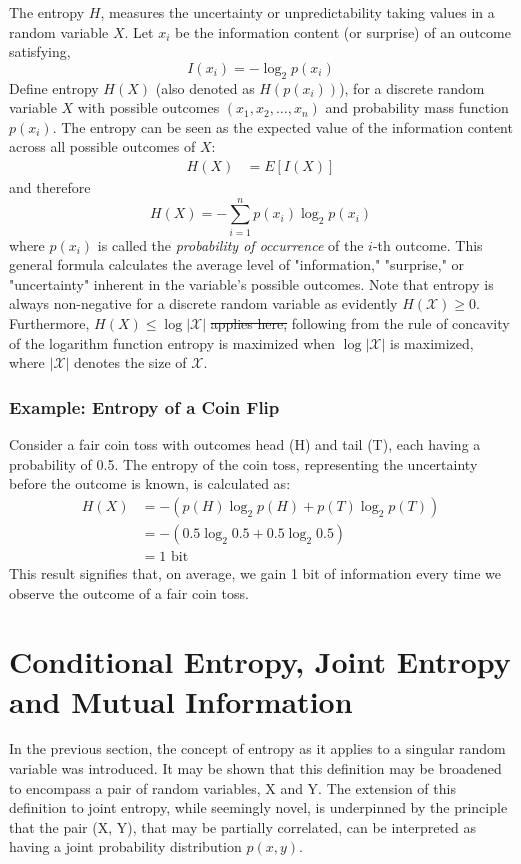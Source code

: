 \documentclass[12pt]{article}
\begin{document}
	The entropy $H$, measures the uncertainty or unpredictability taking values in a random variable $X$. Let $x_i$ be the information content (or surprise) of an outcome satisfying,
	\begin{equation}
		I(x_i) = -\log_2 p(x_i)
	\end{equation}
	Define entropy  $H(X)$ (also denoted as $H(p(x_i))$), for a discrete random variable $X$ with possible outcomes $(x_1, x_2, \ldots, x_n)$ and probability mass function $p(x_i)$. The entropy can be seen as the expected value of the information content across all possible outcomes of $X$:
	\begin{align}
		H(X) &= E[I(X)] 
	\end{align}
	and therefore
	\begin{equation}
		H(X) = -\sum_{i=1}^{n} p(x_i) \log_2 p(x_i)
	\end{equation}
	where $p(x_i)$ is called the \emph{probability of occurrence} of the $i$-th outcome. This general formula calculates the average level of "information," "surprise," or "uncertainty" inherent in the variable's possible outcomes. Note  that entropy is always non-negative for  a discrete random variable as evidently $H(\mathcal{X}) \geq 0$. Furthermore, $H(X) \leq \log | \mathcal{X} |$ \st{applies here,} following from the rule of concavity of the logarithm function entropy is maximized when $ \log | \mathcal{X} |$ is maximized, where $|\mathcal{X} |$ denotes the size of $\mathcal{X}$.
	
	\subsubsection{Example: Entropy of a Coin Flip}
	
	Consider a fair coin toss with outcomes head (H) and tail (T), each having a probability of 0.5. The entropy of the coin toss, representing the uncertainty before the outcome is known, is calculated as:
	\begin{align}
		H(X) &= -\left( p(H) \log_2 p(H) + p(T) \log_2 p(T) \right) \\
		&= -\left( 0.5 \log_2 0.5 + 0.5 \log_2 0.5 \right) \\
		&= 1 \text{ bit}
	\end{align}
	This result signifies that, on average, we gain 1 bit of information every time we observe the outcome of a fair coin toss.

		\section*{Conditional Entropy, Joint Entropy and Mutual Information}
		In the previous section, the concept of entropy as it applies to a singular random variable was introduced. It may be shown that this definition may be broadened to encompass a pair of random variables, X and Y. The extension of this definition to joint entropy, while seemingly novel, is underpinned by the principle that the pair (X, Y), that may be partially correlated, can be interpreted as having a joint probability distribution \(p(x, y)\).
		
\end{document}
